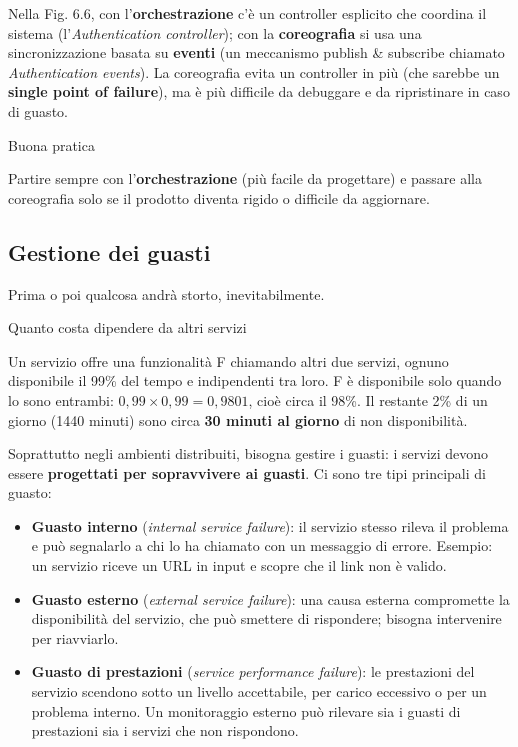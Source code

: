 Nella Fig. 6.6, con l'\textbf{orchestrazione} c'è un controller
esplicito che coordina il sistema (l'\emph{Authentication controller});
con la \textbf{coreografia} si usa una sincronizzazione basata su
\textbf{eventi} (un meccanismo publish \& subscribe chiamato
\emph{Authentication events}). La coreografia evita un controller in più
(che sarebbe un \textbf{single point of failure}), ma è più difficile da
debuggare e da ripristinare in caso di guasto.

\begin{boxtip}{Buona pratica}

Partire sempre con l'\textbf{orchestrazione} (più facile da progettare)
e passare alla coreografia solo se il prodotto diventa rigido o
difficile da aggiornare.

\end{boxtip}

\subsection{Gestione dei guasti}\label{gestione-dei-guasti}

Prima o poi qualcosa andrà storto, inevitabilmente.

\begin{boxexample}{Quanto costa dipendere da altri servizi}

Un servizio offre una funzionalità F chiamando altri due servizi, ognuno
disponibile il 99\% del tempo e indipendenti tra loro. F è disponibile
solo quando lo sono entrambi: \(0{,}99 \times 0{,}99 = 0{,}9801\), cioè
circa il 98\%. Il restante 2\% di un giorno (1440 minuti) sono circa
\textbf{30 minuti al giorno} di non disponibilità.

\end{boxexample}

Soprattutto negli ambienti distribuiti, bisogna gestire i guasti: i
servizi devono essere \textbf{progettati per sopravvivere ai guasti}. Ci
sono tre tipi principali di guasto:

\begin{itemize}
\tightlist
\item
  \textbf{Guasto interno} (\emph{internal service failure}): il servizio
  stesso rileva il problema e può segnalarlo a chi lo ha chiamato con un
  messaggio di errore. Esempio: un servizio riceve un URL in input e
  scopre che il link non è valido.
\item
  \textbf{Guasto esterno} (\emph{external service failure}): una causa
  esterna compromette la disponibilità del servizio, che può smettere di
  rispondere; bisogna intervenire per riavviarlo.
\item
  \textbf{Guasto di prestazioni} (\emph{service performance failure}):
  le prestazioni del servizio scendono sotto un livello accettabile, per
  carico eccessivo o per un problema interno. Un monitoraggio esterno
  può rilevare sia i guasti di prestazioni sia i servizi che non
  rispondono.
\end{itemize}

